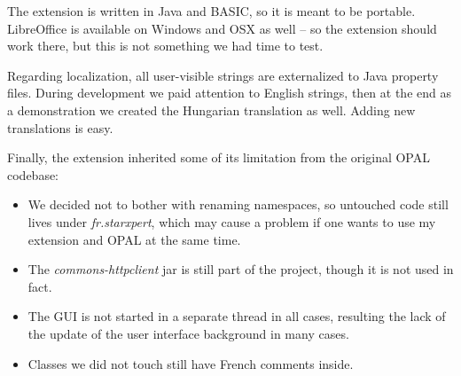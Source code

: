 The extension is written in Java and BASIC, so it is meant to be portable.
LibreOffice is available on Windows and OSX as well -- so the extension should
work there, but this is not something we had time to test.

Regarding localization, all user-visible strings are externalized to Java
property files. During development we paid attention to English strings, then at
the end as a demonstration we created the Hungarian translation as well. Adding
new translations is easy.

Finally, the extension inherited some of its limitation from the original OPAL
codebase:

\begin{itemize}
\item We decided not to bother with renaming namespaces, so untouched code still
lives under \emph{fr.starxpert}, which may cause a problem if one wants to use
my extension and OPAL at the same time.
\item The \emph{commons-httpclient} jar is still part of the project, though it is not used in fact.
\item The GUI is not started in a separate thread in all cases, resulting the
lack of the update of the user interface background in many cases.
\item Classes we did not touch still have French comments inside.
\end{itemize}

